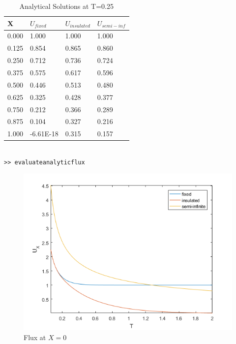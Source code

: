 \documentclass[10pt,a4paper]{report}
\begin{document}
\begin{table}[h]
\centering
\begin{tabular}{|l|l|l|l|}
\hline
\textbf{X} & $U_{fixed}$  & $U_{insulated}$ & $U_{semi-inf}$ \\ \hline
0.000      & 1.000     & 1.000        & 1.000       \\ \hline
0.125      & 0.854     & 0.865        & 0.860       \\ \hline
0.250      & 0.712     & 0.736        & 0.724       \\ \hline
0.375      & 0.575     & 0.617        & 0.596       \\ \hline
0.500      & 0.446     & 0.513        & 0.480       \\ \hline
0.625      & 0.325     & 0.428        & 0.377       \\ \hline
0.750      & 0.212     & 0.366        & 0.289       \\ \hline
0.875      & 0.104     & 0.327        & 0.216       \\ \hline
1.000      & -6.61E-18 & 0.315        & 0.157       \\ \hline
\end{tabular}
\caption{Analytical Solutions at T=0.25}
\end{table}


\begin{verbatim}

>> evaluateanalyticflux 

\end{verbatim}

\begin{figure}[h]
\centering
\includegraphics{flux}
\caption{Flux at $X=0$}
\end{figure}
\end{document}

